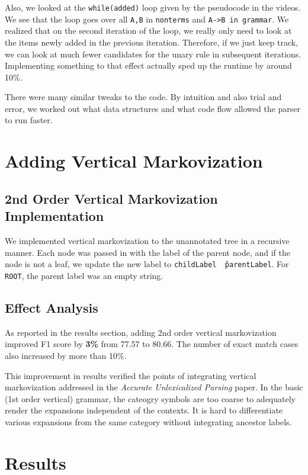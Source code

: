 \documentclass[12pt]{article}
\begin{document}
Also, we looked at the \texttt{while(added)} loop given by the pseudocode in the videos. We see that the loop goes over all \texttt{A,B} in \texttt{nonterms} and \texttt{A->B in grammar}. We realized that on the second iteration of the loop, we really only need to look at the items newly added in the previous iteration. Therefore, if we just keep track, we can look at much fewer candidates for the unary rule in subsequent iterations. Implementing something to that effect actually sped up the runtime by around 10\%.

There were many similar tweaks to the code. By intuition and also trial and error, we worked out what data structures and what code flow allowed the parser to run faster.
\section{Adding Vertical Markovization}
\subsection{2nd Order Vertical Markovization Implementation}
We implemented vertical markovization to the unannotated tree in a recursive manner. Each node was passed in with the label of the parent node, and if the node is not a leaf, we update the new label to \texttt{childLabel \^\ parentLabel}. For \texttt{ROOT}, the parent label was an empty string.
\subsection{Effect Analysis}
As reported in the results section, adding 2nd order vertical markovization improved F1 score by \textbf{3\%} from 77.57 to 80.66. The number of exact match cases also increased by more than 10\%.

This improvement in results verified the points of integrating vertical markovization addressed in the \textit{Accurate Unlexicalized Parsing} paper. In the basic (1st order vertical) grammar, the cateogry symbols are too coarse to adequately render the expansions independent of the contexts. It is hard to differentiate various expansions from the same category without integrating ancestor labels.

\section{Results}
\end{document}
